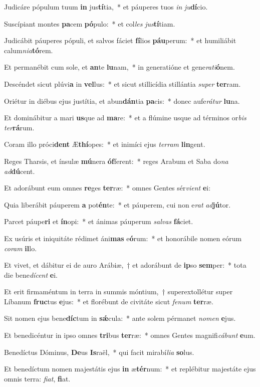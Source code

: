 \item Judicáre pópulum tuum \textbf{in} jus\textbf{tí}tia,~* et páuperes tuos \textit{in} \textit{ju}\textbf{dí}cio.
\item Suscípiant montes \textbf{pa}cem \textbf{pó}pulo:~* et col\textit{les} \textit{jus}\textbf{tí}tiam.
\item Judicábit páuperes pópuli, et salvos fáciet \textbf{fí}lios \textbf{páu}perum:~* et humiliábit calum\textit{ni}\textit{a}\textbf{tó}rem.
\item Et permanébit cum sole, et \textbf{an}te \textbf{lu}nam,~* in generatióne et gene\textit{ra}\textit{ti}\textbf{ó}nem.
\item Descéndet sicut plúvi\textbf{a} in \textbf{vel}lus:~* et sicut stillicídia stillántia \textit{su}\textit{per} \textbf{ter}ram.
\item Oriétur in diébus ejus justítia, et abun\textbf{dán}tia \textbf{pa}cis:~* donec aufe\textit{rá}\textit{tur} \textbf{lu}na.
\item Et dominábitur a mari \textbf{us}que ad \textbf{ma}re:~* et a flúmine usque ad términos or\textit{bis} \textit{ter}\textbf{rá}rum.
\item Coram illo próci\textbf{dent} Æ\textbf{thí}opes:~* et inimíci ejus \textit{ter}\textit{ram} \textbf{lin}gent.
\item Reges Tharsis, et ínsulæ \textbf{mú}nera \textbf{óf}ferent:~* reges Arabum et Saba do\textit{na} \textit{ad}\textbf{dú}cent.
\item Et adorábunt eum omnes \textbf{re}ges \textbf{ter}ræ:~* omnes Gentes sér\textit{vi}\textit{ent} \textbf{e}i:
\item Quia liberábit páuperem \textbf{a} pot\textbf{én}te:~* et páuperem, cui non e\textit{rat} \textit{ad}\textbf{jú}tor.
\item Parcet páupe\textbf{ri} et \textbf{ín}opi:~* et ánimas páuperum \textit{sal}\textit{vas} \textbf{fá}ciet.
\item Ex usúris et iniquitáte rédimet áni\textbf{mas} e\textbf{ó}rum:~* et honorábile nomen eórum \textit{co}\textit{ram} \textbf{il}lo.
\item Et vivet, et dábitur ei de auro Arábiæ,~† et adorábunt de \textbf{ip}so \textbf{sem}per:~* tota die bene\textit{dí}\textit{cent} \textbf{e}i.
\item Et erit firmaméntum in terra in summis móntium,~† superextollétur super Líbanum \textbf{fruc}tus \textbf{e}jus:~* et florébunt de civitáte sicut \textit{fe}\textit{num} \textbf{ter}ræ.
\item Sit nomen ejus bene\textbf{díc}tum in \textbf{sǽ}cula:~* ante solem pérmanet \textit{no}\textit{men} \textbf{e}jus.
\item Et benedicéntur in ipso omnes \textbf{tri}bus \textbf{ter}ræ:~* omnes Gentes magnifi\textit{cá}\textit{bunt} \textbf{e}um.
\item Benedíctus Dóminus, \textbf{De}us \textbf{Is}raël,~* qui facit mirabí\textit{li}\textit{a} \textbf{so}lus.
\item Et benedíctum nomen majestátis ejus \textbf{in} æ\textbf{tér}num:~* et replébitur majestáte ejus omnis terra: \textit{fi}\textit{at}, \textbf{fi}at.
